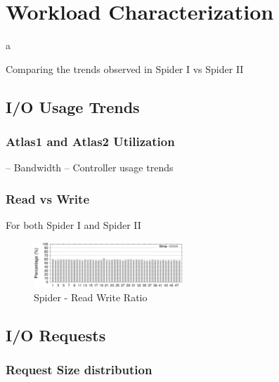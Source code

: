 \section{Workload Characterization}
\label{sec:workloadchar}
a

Comparing the trends observed in Spider I vs Spider II

\subsection{I/O Usage Trends}
\subsubsection{Atlas1 and Atlas2 Utilization}
-- Bandwidth
-- Controller usage trends

\subsubsection{Read vs Write}
For both Spider I and Spider II

\begin{figure}[!t]
\centering
\includegraphics[width=0.5\textwidth]{./figs/spider1-rd-wr-ratio.eps}
\vspace{-0.1in}
\centering
\caption{Spider - Read Write Ratio}
\label{fig:rwratio}
\end{figure}


\subsection{I/O Requests}
\subsubsection{Request Size distribution}

